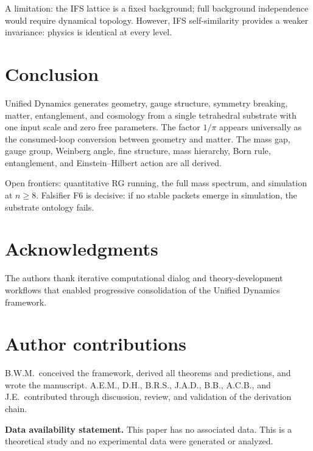 \documentclass[11pt,twocolumn]{article}
\begin{document}
A limitation: the IFS lattice is a fixed background; full background independence would require dynamical topology.
However, IFS self-similarity provides a weaker invariance: physics is identical at every level.

\section{Conclusion}
\label{sec:conclusion}

Unified Dynamics generates geometry, gauge structure, symmetry breaking, matter, entanglement, and cosmology from a single tetrahedral substrate with one input scale and zero free parameters.
The factor $1/\pi$ appears universally as the consumed-loop conversion between geometry and matter.
The mass gap, gauge group, Weinberg angle, fine structure, mass hierarchy, Born rule, entanglement, and Einstein--Hilbert action are all derived.

Open frontiers: quantitative RG running, the full mass spectrum, and simulation at $n\geq 8$.
Falsifier F6 is decisive: if no stable packets emerge in simulation, the substrate ontology fails.

\section*{Acknowledgments}
The authors thank iterative computational dialog and theory-development workflows that enabled progressive consolidation of the Unified Dynamics framework.

\section*{Author contributions}
B.W.M.\ conceived the framework, derived all theorems and predictions, and wrote the manuscript.
A.E.M., D.H., B.R.S., J.A.D., B.B., A.C.B., and J.E.\ contributed through discussion, review, and validation of the derivation chain.

\smallskip
\noindent\textbf{Data availability statement.}
This paper has no associated data.
This is a theoretical study and no experimental data were generated or analyzed.
\end{document}
